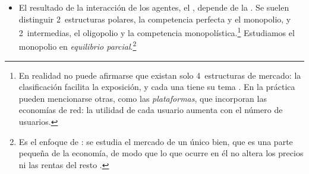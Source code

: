 \documentclass[11pt]{article}
\begin{document}
\begin{itemize}
\begin{itemize}
{\begin{itemize}
\item la economía de la información de , en la que conocer los precios y las calidades exige una búsqueda costosa que se combina con el bien físico.
\end{itemize}
La microeconomía estudia también otros agentes, como el sector público o las instituciones financieras.  recibió el Premio Nobel de Economía en 1982 «por sus estudios pioneros de las estructuras industriales, el funcionamiento de los mercados y las causas y los efectos de la regulación pública»\nocite{Nobel1982Stigler}, y , en 1992, «por haber extendido el análisis microeconómico a un amplio abanico de comportamientos e interacciones humanas, incluidos los que quedan fuera del mercado»\nocite{Nobel1992Becker}.} los consumidores eligen qué consumir sujetos a su restricción presupuestaria, y los productores transforman factores (\emph{inputs}) en productos (\emph{outputs}). Las decisiones de los productores están restringidas por aspectos:
    \begin{itemize}
    \item \emph{técnicos}: cómo se combinan los factores de forma eficiente, dada una tecnología, que estudia la teoría de la producción ;
    \item \emph{de costes}: cuál de las combinaciones técnicamente eficientes es la más barata, que estudia la teoría de los costes ;
    \item \emph{organizativos y de mercado}: el tamaño y los límites de la empresa  y el mercado en el que vende y compra   .
    \end{itemize}
  \item El resultado de la interacción de los agentes, el , depende de la . Se suelen distinguir 2~estructuras polares, la competencia perfecta y el monopolio, y 2~intermedias, el oligopolio y la competencia monopolística.\footnote{En realidad no puede afirmarse que existan solo 4~estructuras de mercado: la clasificación facilita la exposición, y cada una tiene su tema   . En la práctica pueden mencionarse otras, como las \emph{plataformas}, que incorporan las economías de red: la utilidad de cada usuario aumenta con el número de usuarios.} Estudiamos el monopolio en \emph{equilibrio parcial}.\footnote{Es el enfoque de \textcite{Marshall1890Principles}: se estudia el mercado de un único bien, que es una parte pequeña de la economía, de modo que lo que ocurre en él no altera los precios ni las rentas del resto .}

\end{itemize}
\end{itemize}
\end{document}
